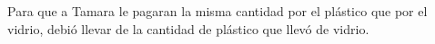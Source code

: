 Para que a Tamara le pagaran la misma cantidad por el plástico que por el vidrio, debió llevar
\fillin[un tercio] de la cantidad de plástico que llevó de vidrio.